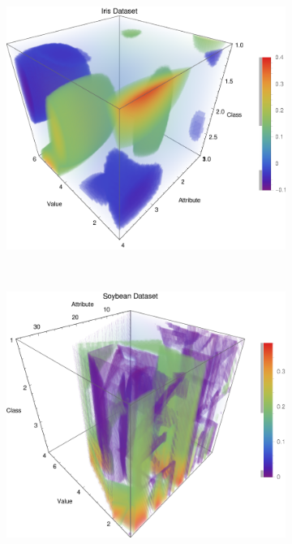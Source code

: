 \documentclass{article}
\begin{document}
\begin{figure}[h!]
\begin{subfigure}[b]{0.32\textwidth}
				\caption{}
				\label{p_glass}					
			\end{subfigure} \	
			\begin{subfigure}[b]{0.32\textwidth}
				\centering
				\includegraphics[width=\textwidth]{figs/NaiveBayes/plot_ptable_iris}	
				\caption{}
				\label{p_iris}				
			\end{subfigure} \	
			\begin{subfigure}[b]{0.32\textwidth}
				\centering
				\includegraphics[width=\textwidth]{figs/NaiveBayes/plot_ptable_soybean}	

\end{subfigure}
\end{figure}
\end{document}
